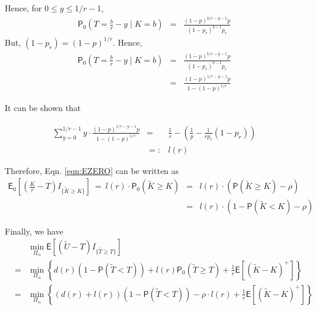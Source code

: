 \documentclass[acmtosn]{acmtrans2m}
\newcommand{\EXP}[1]{\mathsf{E}\!\left[#1\right]}
\begin{document}
Hence, for $0 \le y \le 1/r -1$,
\begin{eqnarray*}
{\mathsf P}_0\left(T= \frac{b}{r} - y \mid K=b \right)  
&=&	  \frac{(1-p)^{b/r-y-1}p}{(1-p_r)^{b-1}p_r}
\end{eqnarray*}
But, $(1-p_r) = (1-p)^{1/r}$. Hence,
\begin{eqnarray*}
{\mathsf P}_0\left(T= \frac{b}{r} - y \mid K=b \right) 
&=&	  \frac{(1-p)^{b/r-y-1}p}{(1-p_r)^{b-1}p_r}\\
&=&	  \frac{(1-p)^{1/r-y-1}p}{1-(1-p)^{1/r}}
\end{eqnarray*}

It can be shown that 

\begin{eqnarray*}
\sum_{y=0}^{1/r-1}y\cdot \frac{(1-p)^{1/r-y-1}p}{1-(1-p)^{1/r}}
&=& \frac{1}{r} - \left(\frac{1}{p} - \frac{1}{rp_r}(1-p_r)\right)\\
&=:&l(r) 
\end{eqnarray*}

Therefore, Eqn. \ref{eqn:EZERO} can be written as
\begin{eqnarray*}
{\mathsf E}_0\left[\left(\frac{K}{r}-T\right) I_{\{\widetilde{K}\ge K\}}\right]
\ = \ l(r) \cdot {\mathsf P}_0\left(\widetilde{K}\ge K\right) 
& = & l(r) \cdot \left({\mathsf P}\left(\widetilde{K}\ge K\right) - \rho \right)\\
& = & l(r) \cdot \left(1 - {\mathsf P}\left(\widetilde{K} < K\right) - \rho \right)
\end{eqnarray*}

Finally, we have 
\begin{eqnarray*}
& & \min_{\Pi_\alpha} \EXP{(\widetilde{U}-T) I_{\{\widetilde{T}\ge
T\}}}\\ 
& = & \min_{\Pi_\alpha} \left\{d(r)\left(1 - {\mathsf P}\left(\widetilde{T} < T\right)\right)
+ l(r){\mathsf P}_0\left(\widetilde{T}\ge T\right)
 + \frac{1}{r}\EXP{(\widetilde{K}-K)^+} \right\}\\
& = & \min_{\Pi_\alpha} \left\{\left(d(r)+l(r)\right)\left(1 - {\mathsf P}\left(\widetilde{T} < T\right)\right) -\rho \cdot l(r) + \frac{1}{r}\EXP{(\widetilde{K}-K)^+}  \right\}
\end{eqnarray*}
\end{document}
